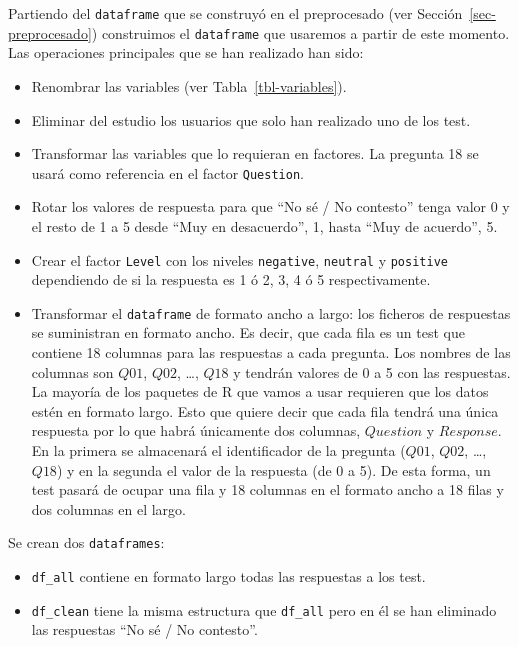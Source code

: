 \documentclass[
  12pt,
  a4paper,
  extrafontsizes,
  onecolumn,
  openright]{memoir}
\providecommand{\tightlist}{%
  \setlength{\itemsep}{0pt}\setlength{\parskip}{0pt}}\usepackage{longtable,booktabs,array}
\begin{document}
\normalsize

Partiendo del \texttt{dataframe} que se construyó en el preprocesado
(ver Sección~\ref{sec-preprocesado}) construimos el \texttt{dataframe}
que usaremos a partir de este momento. Las operaciones principales que
se han realizado han sido:

\begin{itemize}
\tightlist
\item
  Renombrar las variables (ver Tabla~\ref{tbl-variables}).
\item
  Eliminar del estudio los usuarios que solo han realizado uno de los
  test.
\item
  Transformar las variables que lo requieran en factores. La pregunta 18
  se usará como referencia en el factor \texttt{Question}.
\item
  Rotar los valores de respuesta para que \enquote{No sé / No contesto}
  tenga valor 0 y el resto de 1 a 5 desde \enquote{Muy en desacuerdo},
  1, hasta \enquote{Muy de acuerdo}, 5.
\item
  Crear el factor \texttt{Level} con los niveles \texttt{negative},
  \texttt{neutral} y \texttt{positive} dependiendo de si la respuesta es
  1 ó 2, 3, 4 ó 5 respectivamente.
\item
  Transformar el \texttt{dataframe} de formato ancho a largo: los
  ficheros de respuestas se suministran en formato ancho. Es decir, que
  cada fila es un test que contiene 18 columnas para las respuestas a
  cada pregunta. Los nombres de las columnas son \(Q01\), \(Q02\),
  \ldots, \(Q18\) y tendrán valores de 0 a 5 con las respuestas. La
  mayoría de los paquetes de R que vamos a usar requieren que los datos
  estén en formato largo. Esto que quiere decir que cada fila tendrá una
  única respuesta por lo que habrá únicamente dos columnas, \(Question\)
  y \(Response\). En la primera se almacenará el identificador de la
  pregunta (\(Q01\), \(Q02\), \ldots, \(Q18\)) y en la segunda el valor
  de la respuesta (de 0 a 5). De esta forma, un test pasará de ocupar
  una fila y 18 columnas en el formato ancho a 18 filas y dos columnas
  en el largo.
\end{itemize}

Se crean dos \texttt{dataframes}:

\begin{itemize}
\tightlist
\item
  \texttt{df\_all} contiene en formato largo todas las respuestas a los
  test.
\item
  \texttt{df\_clean} tiene la misma estructura que \texttt{df\_all} pero
  en él se han eliminado las respuestas \enquote{No sé / No contesto}.
\end{itemize}
\end{document}
